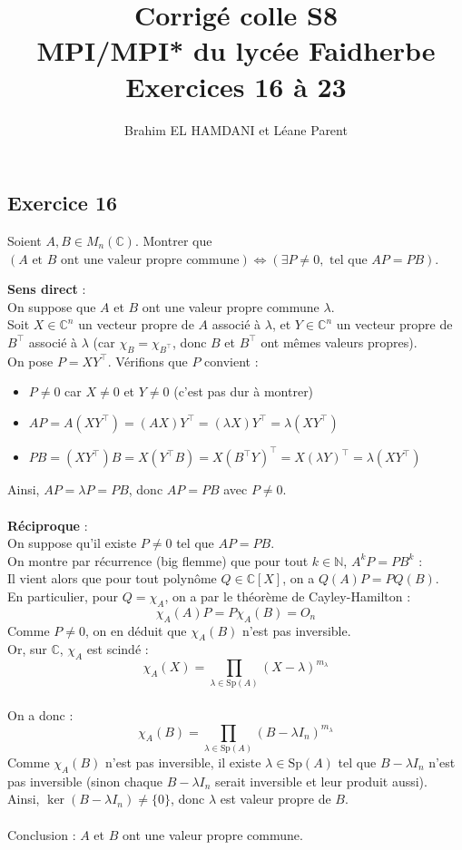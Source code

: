 \documentclass[a4paper,12pt]{article}
\title{Corrigé colle S8 \\
	MPI/MPI* du lycée Faidherbe \\
	\large Exercices 16 à 23}
\author{Brahim EL HAMDANI et Léane Parent}
\begin{document}
	\maketitle
	
	\subsection*{Exercice 16}
    Soient $A, B \in M_n(\mathbb{C})$.
	Montrer que $(A \text{ et } B \text{ ont une valeur propre commune}) \iff (\exists P \neq 0, \text{ tel que } AP = PB)$.
	
	\begin{correctionbox}
		\textbf{Sens direct} : \\
		On suppose que $A$ et $B$ ont une valeur propre commune $\lambda$. \\
		Soit $X \in \mathbb{C}^n$ un vecteur propre de $A$ associé à $\lambda$, et $Y \in \mathbb{C}^n$ un vecteur propre de $B^\top$ associé à $\lambda$ (car  $\chi_B = \chi_{B^\top}$, donc $B$ et $B^\top$ ont mêmes valeurs propres). \\
		On pose $P = X Y^\top$. Vérifions que $P$ convient :
		\begin{itemize}
			\item $P \neq 0$ car $X \neq 0$ et $Y \neq 0$ (c'est pas dur à montrer)
			\item $AP = A(X Y^\top) = (AX) Y^\top = (\lambda X) Y^\top = \lambda (X Y^\top)$
			\item $PB = (X Y^\top) B = X (Y^\top B) = X (B^\top Y)^\top = X (\lambda Y)^\top = \lambda (X Y^\top)$
		\end{itemize}
		Ainsi, $AP = \lambda P = PB$, donc $AP = PB$ avec $P \neq 0$.	
		\\\\
		\textbf{Réciproque} : \\
		On suppose qu'il existe $P \neq 0$ tel que $AP = PB$. \\ On montre par récurrence (big flemme) que pour tout $k \in \mathbb{N}$, $A^k P = P B^k$ :\\ Il vient alors que pour tout polynôme $Q \in \mathbb{C}[X]$, on a $Q(A)P = P Q(B)$.\\En particulier, pour $Q = \chi_A$, on a par le théorème de Cayley-Hamilton :
		$$\chi_A(A) P = P \chi_A(B) = O_n$$
		Comme $P \neq 0$, on en déduit que $\chi_A(B)$ n'est pas inversible. \\
		
		Or, sur $\mathbb{C}$, $\chi_A$ est scindé :
		$$\chi_A(X) = \prod_{\lambda \in \mathrm{Sp}(A)} (X - \lambda)^{m_\lambda}$$\\
		
		On a donc :
		$$\chi_A(B) = \prod_{\lambda \in \mathrm{Sp}(A)} (B - \lambda I_n)^{m_\lambda}$$
		Comme $\chi_A(B)$ n'est pas inversible, il existe $\lambda \in \mathrm{Sp}(A)$ tel que $B - \lambda I_n$ n'est pas inversible (sinon chaque $B - \lambda I_n$ serait inversible et leur produit aussi). \\ Ainsi, $\ker(B - \lambda I_n) \neq \{0\}$, donc $\lambda$ est valeur propre de $B$. \\\\Conclusion : $A$ et $B$ ont une valeur propre commune.
	\end{correctionbox}
\end{document}
